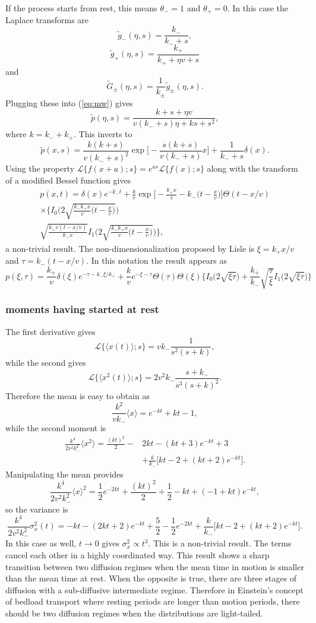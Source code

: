 \documentclass[11pt]{article}
\newcommand\be{\begin{equation}} %
\newcommand\ee{\end{equation}}   %
\newcommand\bra{\langle}
\newcommand\ket{\rangle}
\newcommand\El{\mathcal{L}}
\newcommand\tg{\tilde{g}}
\newcommand\tG{\tilde{G}}
\begin{document}
If the process starts from rest, this means $\theta_- = 1$ and $\theta_+=0$.
In this case the Laplace transforms are
\be \tg_-(\eta,s) = \frac{k_-}{k_- + s}, \ee 
\be \tg_+(\eta,s) = \frac{k_+}{k_+ + \eta v + s }\ee
and
\be \tG_\pm(\eta,s) = \frac{1}{k_\pm}\tg_\pm(\eta,s).\ee
Plugging these into (\ref{eq:mw}) gives
\be \tilde{p}(\eta,s) = \frac{k + s + \eta v }{v(k_-+s) \eta  + k s + s^2 },\ee
where $k = k_- + k_+$. 
This inverts to 
\be \tilde{p}(x,s) = \frac{k(k+s)}{v(k_-+s)^2} \exp\Big[-\frac{s(k+s)}{v(k_-+s)}x\Big] + \frac{1}{k_-+s}\delta(x) .\ee
Using the property $ \El\{f(x+a);s\} = e^{as}\El\{f(x);s\}$ along with the transform of a modified Bessel function gives
\begin{multline}
p(x,t) = \delta(x) e^{-k_- t} + \frac{k}{v}\exp\Big[-\frac{k_+x }{v} - k_-\Big(t-\frac{x}{v}\Big)\Big]\Theta(t-x/v)\\ 
\times \Big\{ I_0\Big(2\sqrt{\frac{k_-k_+x}{v}\big(t-\frac{x}{v}\big)}\Big) \\
\sqrt{\frac{k_+ v(t-x/v)}{k_-x}}I_1\Big(2\sqrt{\frac{k_-k_+x}{v}\big(t-\frac{x}{v}\big)}\Big) 
\Big\},
\end{multline}
a non-trivial result.
The non-dimensionalization proposed by Lisle is $\xi = k_+ x /v$ and $\tau = k_-(t-x/v)$.
In this notation the result appears as
\be p(\xi,\tau) = \frac{k_+}{v}\delta(\xi)e^{-\tau-k_-\xi/k_+} +  \frac{k}{v}e^{-\xi-\tau}\Theta(\tau)\Theta(\xi)\Big\{I_0\big(2\sqrt{\xi \tau}\big) +\frac{k_+}{k_-}\sqrt{\frac{\tau}{\xi}}I_1\big(2\sqrt{\xi\tau}\big) \Big\}\ee

\subsubsection{moments having started at rest}
The first derivative gives 
\be \El\{\bra x(t) \ket;s\} = vk_- \frac{1}{s^2(s+k)},\ee
while the second gives 
\be \El\{\bra x^2(t) \ket ; s\} = 2 v^2 k_- \frac{s+k_-}{s^3(s+k)^2}. \ee
Therefore the mean is easy to obtain as 
\be \frac{k^2}{vk_-} \bra x \ket = e^{-kt} + kt -1,\ee
while the second moment is 
\begin{align}
 \frac{k^4}{2 v^2 k_-^2} \bra x^2\ket = \frac{(kt)^2}{2} - &2kt - (kt+3)e^{-kt} + 3 \\ 
 &+ \frac{k}{k_-}\big[kt -2 + (kt+2)e^{-kt}\big]. 
\end{align}
Manipulating the mean provides 
\be \frac{k^4}{2v^2k_-^2}\bra x \ket^2 = \frac{1}{2}e^{-2kt} + \frac{(kt)^2}{2} + \frac{1}{2} -kt + (-1 + kt)e^{-kt}, \ee
so the variance is 
\be \frac{k^4}{2v^2k_-^2} \sigma_x^2(t) = -kt -(2kt + 2)e^{-kt} + \frac{5}{2} - \frac{1}{2}e^{-2kt} + \frac{k}{k_-}\big[kt-2 + (kt +2)e^{-kt}\big].\ee
In this case as well, $t\rightarrow 0$ gives $\sigma_x^2 \propto t^3$.
This is a non-trivial result. The terms cancel each other in a highly coordinated way.
This result shows a sharp transition between two diffusion regimes when the mean time in motion is smaller than the mean time at rest.
When the opposite is true, there are three stages of diffusion with a sub-diffusive intermediate regime.
Therefore in Einstein's concept of bedload transport where resting periods are longer than motion periods, there should be two diffusion regimes when the distributions are light-tailed.
\end{document}
